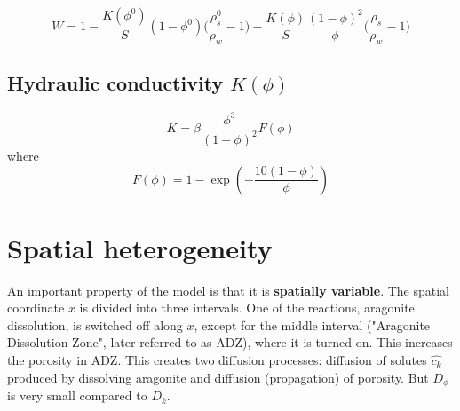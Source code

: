 \documentclass[11pt, letterpaper]{article}
\begin{document}
\begin{equation}
    W = 1 - \frac{K(\phi^0)}{S}(1-\phi^0) \big(\frac{\rho_s^0}{\rho_w}-1) - \frac{K(\phi)}{S} \frac{(1-\phi)^2}{\phi}\big(\frac{\rho_s}{\rho_w}-1\big)
\end{equation}

\section{Hydraulic conductivity $K(\phi)$}

\begin{equation}
    K = \beta \frac{\phi^3}{(1 - \phi)^2}F(\phi)
\end{equation}
where
\begin{equation}
    F(\phi) = 1 - \exp\left( -\frac{10(1-\phi)}{\phi} \right)
\end{equation}

\chapter{Spatial heterogeneity}

An important property of the model is that it is \textbf{spatially variable}. The spatial coordinate $x$ is divided into three intervals. One of the reactions, aragonite dissolution, is switched off along $x$, except for the middle interval ("Aragonite Dissolution Zone", later referred to as ADZ), where it is turned on. This increases the porosity in ADZ. This creates two diffusion processes: diffusion of solutes $\hat{c_k}$ produced by dissolving aragonite and diffusion (propagation) of porosity. But $D_{\phi}$ is very small compared to $D_k$.
\end{document}
